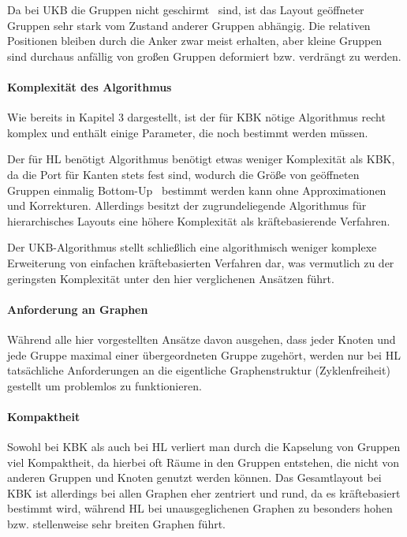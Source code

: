 Da bei UKB die Gruppen nicht \glqq geschirmt \grqq\ sind, ist das Layout geöffneter Gruppen sehr stark vom Zustand anderer Gruppen abhängig. Die relativen Positionen bleiben durch die Anker zwar meist erhalten, 
 aber kleine Gruppen sind durchaus anfällig von großen Gruppen deformiert bzw. verdrängt zu werden.

\paragraph*{Komplexität des Algorithmus}
Wie bereits in Kapitel 3 dargestellt, ist der für KBK nötige Algorithmus recht komplex und enthält einige Parameter, die noch bestimmt werden müssen.

Der für HL benötigt Algorithmus benötigt etwas weniger Komplexität als KBK, da die Port für Kanten stets fest sind, wodurch die Größe von geöffneten Gruppen einmalig \glqq Bottom-Up \grqq\ bestimmt werden kann ohne Approximationen und Korrekturen. Allerdings besitzt der zugrundeliegende Algorithmus für hierarchisches Layouts eine höhere Komplexität als kräftebasierende Verfahren.

Der UKB-Algorithmus stellt schließlich eine algorithmisch weniger komplexe Erweiterung von einfachen kräftebasierten Verfahren dar, was vermutlich zu der geringsten Komplexität unter den hier verglichenen Ansätzen führt.

\paragraph*{Anforderung an Graphen}
Während alle hier vorgestellten Ansätze davon ausgehen, dass jeder Knoten und jede Gruppe maximal einer übergeordneten Gruppe zugehört, werden nur bei HL tatsächliche Anforderungen an die eigentliche Graphenstruktur (Zyklenfreiheit) gestellt um problemlos zu funktionieren.

\paragraph*{Kompaktheit}
Sowohl bei KBK als auch bei HL verliert man durch die Kapselung von Gruppen viel Kompaktheit, da hierbei oft Räume in den Gruppen entstehen, die nicht von anderen Gruppen und Knoten genutzt werden können. Das Gesamtlayout bei KBK ist allerdings bei allen Graphen eher zentriert und rund, da es kräftebasiert bestimmt wird, während HL bei unausgeglichenen Graphen zu besonders hohen bzw. stellenweise sehr breiten Graphen führt.

